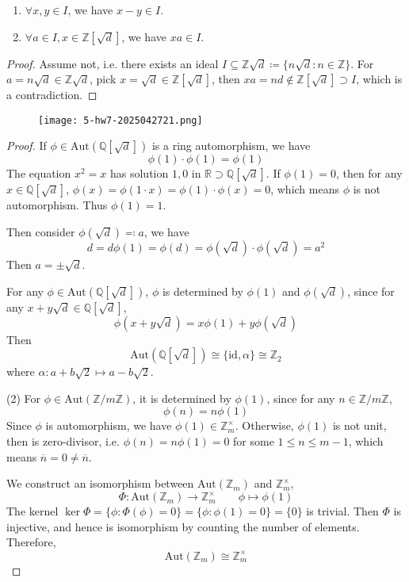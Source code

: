 \begin{enumerate}
	\item $\forall x, y\in I$, we have $x-y\in I$.
	\item $\forall a\in I, x\in \mathbb{Z}[\sqrt{ d }]$, we have $xa\in I$.
\end{enumerate}

\begin{proof}
Assume not, i.e. there exists an ideal $I\subseteq \mathbb{Z}\sqrt{ d }\coloneqq \{ n\sqrt{ d }:n\in \mathbb{Z} \}$. For $a=n\sqrt{ d }\in \mathbb{Z}\sqrt{ d }$, pick $x=\sqrt{ d }\in \mathbb{Z}[\sqrt{ d }]$, then $xa=nd\not\in \mathbb{Z}[\sqrt{ d }]\supset I$, which is a contradiction.
\end{proof}

\begin{exercise}
\begin{figure}[H]
\centering
\texttt{[image: 5-hw7-2025042721.png]}
\label{}
\end{figure}
\end{exercise}
\begin{proof}
If $\phi\in \mathrm{Aut}(\mathbb{Q}[\sqrt{ d }])$ is a ring automorphism, we have
\[
\phi(1)\cdot \phi(1)=\phi(1)
\]
The equation $x^2=x$ has solution $1,0$ in $\mathbb{R}\supset \mathbb{Q}[\sqrt{ d }]$. If $\phi(1)=0$, then for any $x\in \mathbb{Q}[\sqrt{ d }]$, $\phi(x)=\phi(1\cdot x)=\phi(1)\cdot \phi(x)=0$, which means $\phi$ is not automorphism. Thus $\phi(1)=1$.

Then consider $\phi(\sqrt{ d })\eqqcolon a$, we have
\[
d=d\phi(1)=\phi(d)=\phi(\sqrt{ d })\cdot \phi(\sqrt{ d })=a^2
\]
Then $a=\pm \sqrt{ d }$.

For any $\phi\in \mathrm{Aut}(\mathbb{Q}[\sqrt{ d }])$, $\phi$ is determined by $\phi(1)$ and $\phi(\sqrt{ d })$, since for any $x+y\sqrt{ d }\in \mathbb{Q}[\sqrt{ d }]$,
\[
\phi(x+y\sqrt{ d })=x\phi(1)+y\phi(\sqrt{ d })
\]
Then
\[
\mathrm{Aut}(\mathbb{Q}[\sqrt{ d }])\cong  \{ \mathrm{id}, \alpha \}\cong \mathbb{Z}_{2}
\]
where $\alpha:a+b \sqrt{ 2 }\longmapsto a-b \sqrt{ 2 }$.

(2) For $\phi\in\mathrm{Aut}(\mathbb{Z}/m\mathbb{Z})$, it is determined by $\phi(1)$, since for any $n\in \mathbb{Z}/m\mathbb{Z}$,
\[
\phi (n)=n\phi(1)
\]
Since $\phi$ is automorphism, we have $\phi (1)\in \mathbb{Z}^{\times}_{m}$. Otherwise, $\phi(1)$ is not unit, then is zero-divisor, i.e. $\phi(n)=n\phi(1)=0$ for some $1\leq n\leq m-1$, which means $\overline{n}=0\neq \overline{n}$.

We construct an isomorphism between $\mathrm{Aut}(\mathbb{Z}_m)$ and $\mathbb{Z}_m^{\times}$,
\[
\Phi:\mathrm{Aut}(\mathbb{Z}_m)\to \mathbb{Z}_m^{\times}\qquad \phi\mapsto \phi(1)
\]
The kernel $\ker \Phi=\{ \phi:\Phi(\phi)=0 \}=\{ \phi:\phi(1)=0 \}=\{ 0 \}$ is trivial. Then $\Phi$ is injective, and hence is isomorphism by counting the number of elements. Therefore,
\[
\mathrm{Aut}(\mathbb{Z}_m)\cong  \mathbb{Z}_m^{\times}
\]
\end{proof}

